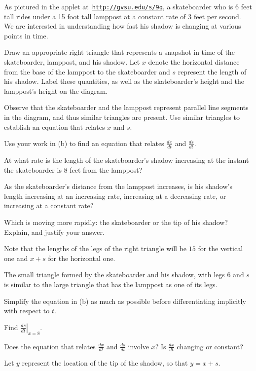\begin{activity} \label{A:3.5.3}  As pictured in the applet at~\href{http://gvsu.edu/s/9q}{\texttt{http://gvsu.edu/s/9q}}, a skateboarder who is 6 feet tall rides under a 15 foot tall lamppost at a constant rate of 3 feet per second.  We are interested in understanding how fast his shadow is changing at various points in time.
\ba
	\item Draw an appropriate right triangle that represents a snapshot in time of the skateboarder, lamppost, and his shadow.  Let $x$ denote the horizontal distance from the base of the lamppost to the skateboarder and $s$ represent the length of his shadow.  Label these quantities, as well as the skateboarder's height and the lamppost's height on the diagram.
	\item Observe that the skateboarder and the lamppost represent parallel line segments in the diagram, and thus similar triangles are present.  Use similar triangles to establish an equation that relates $x$ and $s$.
	\item Use your work in (b) to find an equation that relates $\frac{dx}{dt}$ and $\frac{ds}{dt}$.
	\item At what rate is the length of the skateboarder's shadow increasing at the instant the skateboarder is 8 feet from the lamppost?
	\item As the skateboarder's distance from the lamppost increases, is his shadow's length increasing at an increasing rate, increasing at a decreasing rate, or increasing at a constant rate?
	\item Which is moving more rapidly:  the skateboarder or the tip of his shadow?  Explain, and justify your answer.
\ea
\end{activity}
\begin{smallhint}
\ba
	\item Note that the lengths of the legs of the right triangle will be $15$ for the vertical one and $x + s$ for the horizontal one.
	\item The small triangle formed by the skateboarder and his shadow, with legs $6$ and $s$ is similar to the large triangle that has the lamppost as one of its legs.
	\item Simplify the equation in (b) as much as possible before differentiating implicitly with respect to $t$.
	\item Find $\left. \frac{ds}{dt} \right|_{x=8}$.
	\item Does the equation that relates $\frac{dx}{dt}$ and $\frac{ds}{dt}$ involve $x$?  Is $\frac{dx}{dt}$ changing or constant?
	\item Let $y$ represent the location of the tip of the shadow, so that $y = x + s$.
\ea
\end{smallhint}
